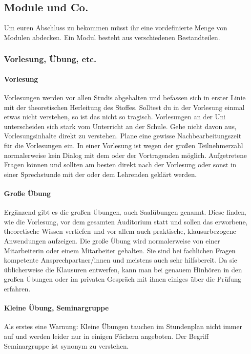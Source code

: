 
\subsection{Module und Co.}
	Um euren Abschluss zu bekommen müsst ihr eine vordefinierte Menge von Modulen abdecken. Ein Modul besteht aus verschiedenen Bestandteilen.

\subsubsection{Vorlesung, Übung, etc.}
	\paragraph*{Vorlesung}
	Vorlesungen werden vor allen Studis abgehalten und befassen sich in erster Linie mit der theoretischen Herleitung des Stoffes. Solltest du in der Vorlesung einmal etwas nicht verstehen, so ist das nicht so tragisch. Vorlesungen an der Uni unterscheiden sich stark vom Unterricht an der Schule. Gehe nicht davon aus, Vorlesungsinhalte direkt zu verstehen. Plane eine gewisse Nachbearbeitungszeit für die Vorlesungen ein. In einer Vorlesung ist wegen der großen Teilnehmerzahl normalerweise kein Dialog mit dem oder der Vortragenden möglich. Aufgetretene Fragen können und sollten am besten direkt nach der Vorlesung oder sonst in einer Sprechstunde mit der oder dem Lehrenden geklärt werden.
	
	\paragraph*{Große Übung}
	Ergänzend gibt es die großen Übungen, auch Saalübungen genannt. Diese finden, wie die Vorlesung, vor dem gesamten Auditorium statt und sollen das erworbene, theoretische Wissen vertiefen und vor allem auch praktische, klausurbezogene Anwendungen aufzeigen. Die große Übung wird normalerweise von einer Mitarbeiterin oder einem Mitarbeiter gehalten. Sie sind bei  fachlichen Fragen kompetente Ansprechpartner/innen und meistens auch sehr hilfsbereit. Da sie  üblicherweise die Klausuren entwerfen, kann man bei genauem Hinhören in den großen Übungen oder im privaten Gespräch mit ihnen einiges über die Prüfung erfahren.

	\paragraph*{Kleine Übung, Seminargruppe}
	Als erstes eine Warnung: Kleine Übungen tauchen im Stundenplan nicht immer auf und werden leider nur in einigen Fächern angeboten. Der Begriff Seminargruppe ist synonym zu verstehen.
	

